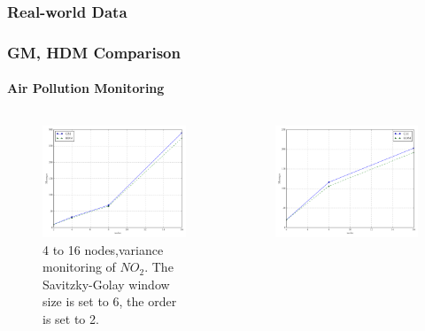 \documentclass[hyperref={pdfpagelabels=false}]{beamer}
\begin{document}
\subsubsection*{Real-world Data}
\begin{frame} \frametitle{GM, HDM Comparison}\framesubtitle{Air Pollution Monitoring}
\begin{columns}
\begin{column}[t]{0.5\linewidth}
\begin{figure}
\vspace{-0.8cm}
\centering
   \includegraphics[scale=0.23]{../img/actual_msg_NO2_sq_2014_nodes_wl_6_order_2.pdf}
  \caption{4 to 16 nodes,variance monitoring of $NO_2$. The Savitzky-Golay window size is set to 6, the order is set to 2.}
\end{figure}
\end{column}
\begin{column}[t]{0.5\linewidth}
\begin{figure}
\vspace{-0.8cm}
\centering
  \includegraphics[scale=0.23]{../img/actual_msg_NO2_NO_2014_nodes.pdf}

\end{figure}
\end{column}
\end{columns}
\end{frame}
\end{document}
